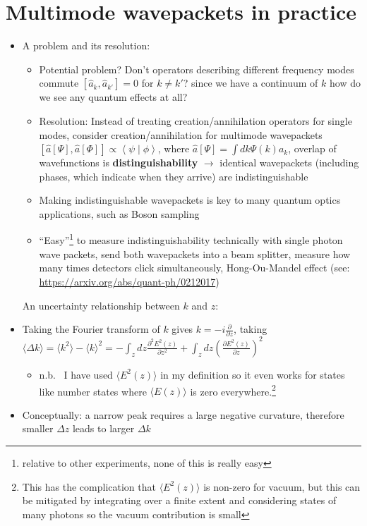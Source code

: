 \documentclass[english]{article}
\newcommand{\braket}[2]{\left \langle #1 \mid #2 \right \rangle}
\newcommand{\average}[1]{\langle #1 \rangle}
\begin{document}
\section{Multimode wavepackets in practice}
\begin{itemize}
\item A problem and its resolution:
\begin{itemize}
\item Potential problem? Don't operators describing different frequency modes commute $[\hat{a}_k,\hat{a}_{k'}]=0$ for $k\neq k'$? since we have a continuum of $k$ how do we see any quantum effects at all?
\item Resolution: Instead of treating creation/annihilation operators for single modes, consider creation/annihilation for multimode wavepackets $[\hat{a}[\Psi],\hat{a}[\Phi]]\propto \braket{\psi}{\phi}$, where $\hat{a}[\Psi]=\int dk\Psi(k) a_k$, overlap of wavefunctions is \textbf{distinguishability} $\rightarrow$ identical wavepackets (including phases, which indicate when they arrive) are indistinguishable
\item Making indistinguishable wavepackets is key to many quantum optics applications, such as Boson sampling
\item ``Easy''\footnote{relative to other experiments, none of this is really easy} to measure indistinguishability technically  with single photon wave packets, send both wavepackets into a beam splitter, measure how many times detectors click simultaneously, Hong-Ou-Mandel effect (see: \href{arXiv:quant-ph/0212017}{https://arxiv.org/abs/quant-ph/0212017})
\end{itemize}
 An uncertainty relationship between $k$ and $z$:
\item Taking the Fourier transform of $k$ gives $k=-i\frac{\partial}{\partial z}$, taking $\average{\Delta k}=\average{k^2}-\average{k}^2=-\int_z dz\frac{\partial^2E^2(z)}{\partial z^2}+\int_zdz(\frac{\partial E^2(z)}{\partial z})^2$ 
\begin{itemize}
\item n.b.~ I have used $\average{E^2(z)}$ in my definition so it even works for states like number states where $\average{E(z)}$ is zero everywhere.\footnote{This has the complication that $\average{E^2(z)}$ is non-zero for vacuum, but this can be mitigated by integrating over a finite extent and considering states of many photons so the vacuum contribution is small}
\end{itemize}
\item Conceptually: a narrow peak requires a large negative curvature, therefore smaller $\Delta z$ leads to larger $\Delta k$

\end{itemize}
\end{document}
